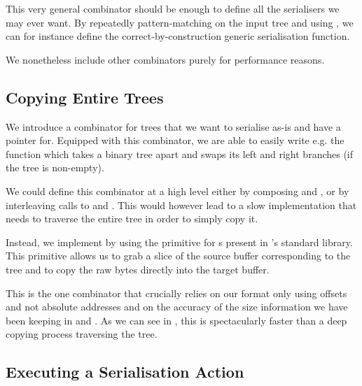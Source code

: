 This very general combinator should be enough to define all the
serialisers we may ever want.
%
By repeatedly pattern-matching on the input tree and using \IdrisFunction{(\#)},
we can for instance define the correct-by-construction generic serialisation function.


We nonetheless include other combinators purely for performance reasons.

\subsection{Copying Entire Trees}\label{sec:copy}

We introduce a  combinator for trees that we want to
serialise as-is and have a pointer for.
%
Equipped with this combinator, we are able to easily write e.g.
the  function which takes a binary tree apart
and swaps its left and right branches (if the tree is non-empty).


We could define this  combinator at a high level
either by composing
 and ,
or by interleaving calls to  and \IdrisFunction{(\#)}.
%
This would however lead to a slow implementation that needs to
traverse the entire tree in order to simply copy it.

Instead, we implement  by using the
 primitive for s
present in \idris{}'s standard library.
%
This primitive allows us to grab a slice of the source buffer
corresponding to the tree
and to copy the raw bytes directly into the target buffer.


This is the one combinator that crucially relies
on our format only using offsets and not absolute addresses
and on the accuracy of the size information we have been keeping
in  and .
%
As we can see in , this is spectacularly faster than
a deep copying process traversing the tree.

\subsection{Executing a Serialisation Action}\label{sec:execserialising}

